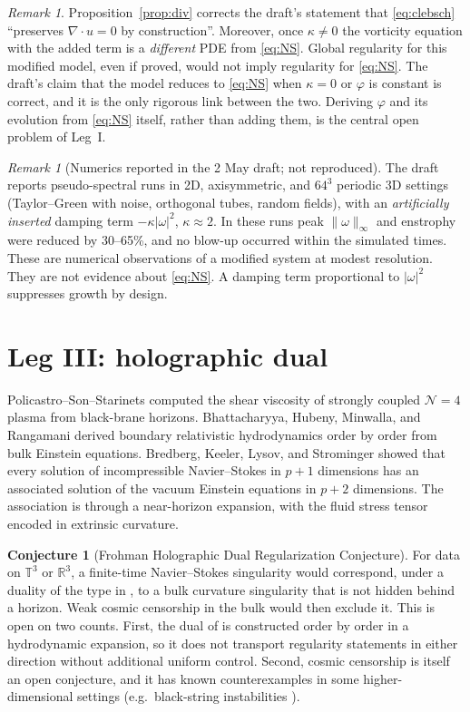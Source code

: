 \documentclass[11pt]{amsart}
\theoremstyle{definition}
\newtheorem{conjecture}[theorem]{Conjecture}
\theoremstyle{remark}
\newtheorem{remark}[theorem]{Remark}
\newcommand{\T}{\mathbb{T}}
\newcommand{\R}{\mathbb{R}}
\begin{document}
\begin{remark}
Proposition~\ref{prop:div} corrects the draft's statement that \eqref{eq:clebsch} ``preserves $\nabla\cdot u=0$ by construction''. Moreover, once $\kappa\neq0$ the vorticity equation with the added term is a \emph{different} PDE from \eqref{eq:NS}. Global regularity for this modified model, even if proved, would not imply regularity for \eqref{eq:NS}. The draft's claim that the model reduces to \eqref{eq:NS} when $\kappa=0$ or $\varphi$ is constant is correct, and it is the only rigorous link between the two. Deriving $\varphi$ and its evolution from \eqref{eq:NS} itself, rather than adding them, is the central open problem of Leg~I.
\end{remark}

\begin{remark}[Numerics reported in the 2 May draft; not reproduced]
The draft reports pseudo-spectral runs in 2D, axisymmetric, and $64^3$ periodic 3D settings (Taylor--Green with noise, orthogonal tubes, random fields), with an \emph{artificially inserted} damping term $-\kappa|\omega|^2$, $\kappa\approx2$. In these runs peak $\|\omega\|_\infty$ and enstrophy were reduced by 30--65\%, and no blow-up occurred within the simulated times. These are numerical observations of a modified system at modest resolution. They are not evidence about \eqref{eq:NS}. A damping term proportional to $|\omega|^2$ suppresses growth by design.
\end{remark}

\section{Leg III: holographic dual}
Policastro--Son--Starinets \cite{PSS2001} computed the shear viscosity of strongly coupled $\mathcal{N}=4$ plasma from black-brane horizons. Bhattacharyya, Hubeny, Minwalla, and Rangamani \cite{BHMR2008} derived boundary relativistic hydrodynamics order by order from bulk Einstein equations. Bredberg, Keeler, Lysov, and Strominger \cite{BKLS2012} showed that every solution of incompressible Navier--Stokes in $p+1$ dimensions has an associated solution of the vacuum Einstein equations in $p+2$ dimensions. The association is through a near-horizon expansion, with the fluid stress tensor encoded in extrinsic curvature.

\begin{conjecture}[Frohman Holographic Dual Regularization Conjecture]
For data on $\T^3$ or $\R^3$, a finite-time Navier--Stokes singularity would correspond, under a duality of the type in \cite{BKLS2012}, to a bulk curvature singularity that is not hidden behind a horizon. Weak cosmic censorship in the bulk \cite{Penrose1969} would then exclude it. This is open on two counts. First, the dual of \cite{BKLS2012} is constructed order by order in a hydrodynamic expansion, so it does not transport regularity statements in either direction without additional uniform control. Second, cosmic censorship is itself an open conjecture, and it has known counterexamples in some higher-dimensional settings (e.g.\ black-string instabilities \cite{LehnerPretorius2010}).
\end{conjecture}
\end{document}
